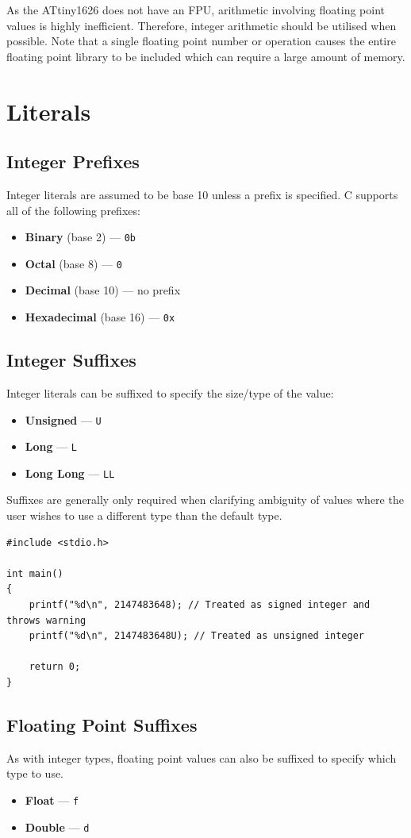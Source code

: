 \documentclass{report}
\begin{document}
As the ATtiny1626 does not have an FPU, arithmetic involving floating point values is highly inefficient. Therefore,
integer arithmetic should be utilised when possible. Note that a single floating point number or operation causes
the entire floating point library to be included which can require a large amount of memory.
\chapter{Literals}
\section{Integer Prefixes}
Integer literals are assumed to be base 10 unless a prefix is specified. C supports
all of the following prefixes:
\begin{itemize}
    \item \textbf{Binary} (base 2) --- \texttt{0b}
    \item \textbf{Octal} (base 8) --- \texttt{0}
    \item \textbf{Decimal} (base 10) --- no prefix
    \item \textbf{Hexadecimal} (base 16) --- \texttt{0x}
\end{itemize}
\section{Integer Suffixes}
Integer literals can be suffixed to specify the size/type of the value:
\begin{itemize}
    \item \textbf{Unsigned} --- \texttt{U}
    \item \textbf{Long} --- \texttt{L}
    \item \textbf{Long Long} --- \texttt{LL}
\end{itemize}
Suffixes are generally only required when clarifying ambiguity of values where the user wishes to use a different type than the default type.
\begin{verbatim}
#include <stdio.h>

int main()
{
    printf("%d\n", 2147483648); // Treated as signed integer and throws warning
    printf("%d\n", 2147483648U); // Treated as unsigned integer

    return 0;
}
\end{verbatim}
\section{Floating Point Suffixes}
As with integer types, floating point values can also be suffixed to specify which type to use.
\begin{itemize}
    \item \textbf{Float} --- \texttt{f}
    \item \textbf{Double} --- \texttt{d}
\end{itemize}
\end{document}
